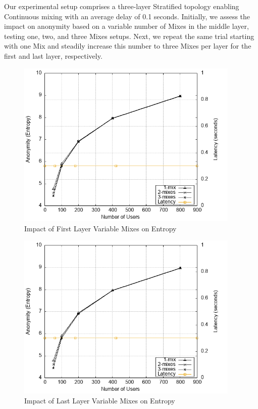 \documentclass[logo,msc,cyber]{infthesis}   %
\begin{document}
Our experimental setup comprises a three-layer Stratified topology enabling
Continuous mixing with an average delay of 0.1 seconds. Initially, we assess the
impact on anonymity based on a variable number of Mixes in the middle layer,
testing one, two, and three Mixes setups. Next, we repeat the same trial
starting with one Mix and steadily increase this number to three Mixes per layer
for the first and last layer, respectively.

\begin{figure}[h!]
    \centering
    \includegraphics[height=8cm]{figures/simulator_extentions/first_layer_variable.png}
    \caption{Impact of First Layer Variable Mixes on Entropy}
    \label{fig:first-layer-variable}
\end{figure} 

\begin{figure}[h!]
    \centering
    \includegraphics[height=8cm]{figures/simulator_extentions/last_layer_variable.png}
    \caption{Impact of Last Layer Variable Mixes on Entropy}
    \label{fig:last-layer-variable}
\end{figure} 
\end{document}
